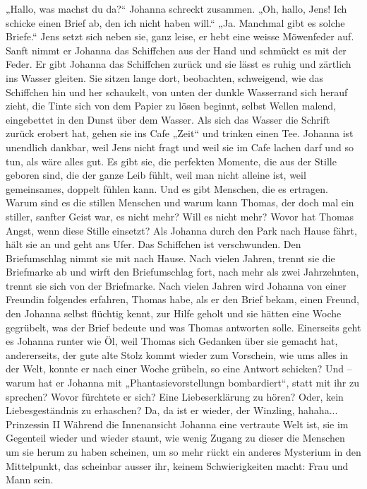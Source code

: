 „Hallo, was machst du da?“ Johanna schreckt zusammen. „Oh, hallo, Jens! Ich schicke einen Brief ab, den ich nicht haben will.“ „Ja. Manchmal gibt es solche Briefe.“ Jens setzt sich neben sie, ganz leise, er hebt eine weisse Möwenfeder auf. Sanft nimmt er Johanna das Schiffchen aus der Hand und schmückt es mit der Feder. Er gibt Johanna das Schiffchen zurück und sie lässt es ruhig und zärtlich ins Wasser gleiten. Sie sitzen lange dort, beobachten, schweigend, wie das Schiffchen hin und her schaukelt, von unten der dunkle Wasserrand sich herauf zieht, die Tinte sich von dem Papier zu lösen beginnt, selbst Wellen malend, eingebettet in den Dunst über dem Wasser.
Als sich das Wasser die Schrift zurück erobert hat, gehen sie ins Cafe „Zeit“ und trinken einen Tee. Johanna ist unendlich dankbar, weil Jens nicht fragt und weil sie im Cafe lachen darf und so tun, als wäre alles gut. Es gibt sie, die perfekten Momente, die aus der Stille geboren sind, die der ganze Leib fühlt, weil man nicht alleine ist, weil gemeinsames, doppelt fühlen kann. Und es gibt Menschen, die es ertragen. Warum sind es die stillen Menschen und warum kann Thomas, der doch mal ein stiller, sanfter Geist war, es nicht mehr? Will es nicht mehr? Wovor hat Thomas Angst, wenn diese Stille einsetzt? Als Johanna durch den Park nach Hause fährt, hält sie an und geht ans Ufer. Das Schiffchen ist verschwunden. Den Briefumschlag nimmt sie mit nach Hause. Nach vielen Jahren, trennt sie die Briefmarke ab und wirft den Briefumschlag fort, nach mehr als zwei Jahrzehnten, trennt sie sich von der Briefmarke.
Nach vielen Jahren wird Johanna von einer Freundin folgendes erfahren, Thomas habe, als er den Brief bekam, einen Freund, den Johanna selbst flüchtig kennt, zur Hilfe geholt und sie hätten eine Woche gegrübelt, was der Brief bedeute und was Thomas antworten solle. Einerseits geht es Johanna runter wie Öl, weil Thomas sich Gedanken über sie gemacht hat, andererseits, der gute alte Stolz kommt wieder zum Vorschein, wie ums alles in der Welt, konnte er nach einer Woche grübeln, so eine Antwort schicken? Und – warum hat er Johanna mit „Phantasievorstellungn bombardiert“, statt mit ihr zu sprechen? Wovor fürchtete er sich? Eine Liebeserklärung zu hören? Oder, kein Liebesgeständnis zu erhaschen? Da, da ist er wieder, der Winzling, hahaha...
Prinzessin II
Während die Innenansicht Johanna eine vertraute Welt ist, sie im Gegenteil wieder und wieder staunt, wie wenig Zugang zu dieser die Menschen um sie herum zu haben scheinen, um so mehr rückt ein anderes Mysterium in den Mittelpunkt, das scheinbar ausser ihr, keinem Schwierigkeiten macht: Frau und Mann sein.
